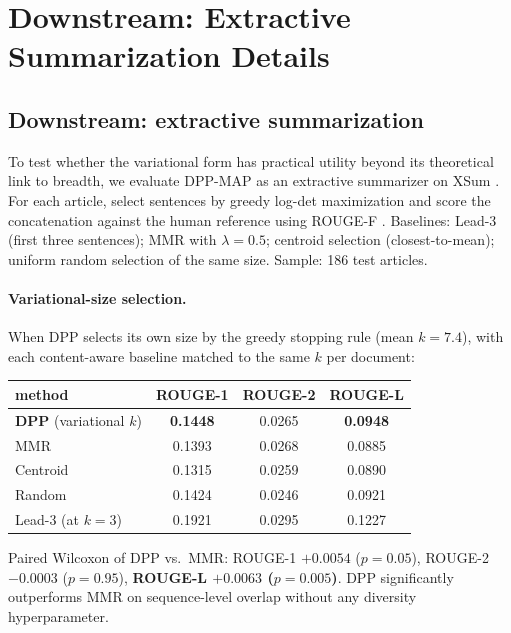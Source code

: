 \documentclass[11pt]{article}
\begin{document}
\section{Downstream: Extractive Summarization Details}\label{app:extsumm}

\subsection{Downstream: extractive summarization}\label{sec:extsumm}

To test whether the variational form has practical utility beyond its theoretical link to breadth, we evaluate DPP-MAP as an extractive summarizer on XSum \cite{narayan-etal-2018-xsum}. For each article, select sentences by greedy log-det maximization and score the concatenation against the human reference using ROUGE-F \cite{lin-2004-rouge}. Baselines: Lead-3 (first three sentences); MMR \cite{carbonell-goldstein-1998-mmr} with $\lambda = 0.5$; centroid selection (closest-to-mean); uniform random selection of the same size. Sample: 186 test articles.

\paragraph{Variational-size selection.} When DPP selects its own size by the greedy stopping rule (mean $k = 7.4$), with each content-aware baseline matched to the same $k$ per document:

\begin{center}
\begin{tabular}{lccc}
\toprule
method & ROUGE-1 & ROUGE-2 & ROUGE-L \\
\midrule
\textbf{DPP} (variational $k$) & \textbf{0.1448} & 0.0265 & \textbf{0.0948} \\
MMR                            & 0.1393 & 0.0268 & 0.0885 \\
Centroid                       & 0.1315 & 0.0259 & 0.0890 \\
Random                         & 0.1424 & 0.0246 & 0.0921 \\
Lead-3 (at $k=3$)              & 0.1921 & 0.0295 & 0.1227 \\
\bottomrule
\end{tabular}
\end{center}

Paired Wilcoxon of DPP vs.\ MMR: ROUGE-1 $+0.0054$ ($p=0.05$), ROUGE-2 $-0.0003$ ($p=0.95$), \textbf{ROUGE-L $+0.0063$ ($p=0.005$)}. DPP significantly outperforms MMR on sequence-level overlap without any diversity hyperparameter.
\end{document}
